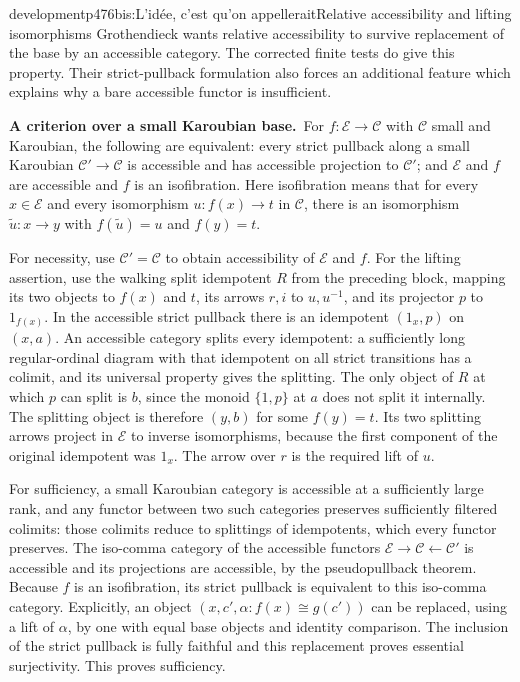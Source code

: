 \begin{dcomment}{development}{p476bis:L'idée, c'est qu'on appellerait}{Relative accessibility and lifting isomorphisms}
Grothendieck wants relative accessibility to survive replacement of the base by an accessible category. The corrected finite tests do give this property. Their strict-pullback formulation also forces an additional feature which explains why a bare accessible functor is insufficient.

\textbf{A criterion over a small Karoubian base.}\ours\
For $f:\mathcal E\to\mathcal C$ with $\mathcal C$ small and Karoubian, the following are equivalent: every strict pullback along a small Karoubian $\mathcal C'\to\mathcal C$ is accessible and has accessible projection to $\mathcal C'$; and $\mathcal E$ and $f$ are accessible and $f$ is an isofibration. Here isofibration means that for every $x\in\mathcal E$ and every isomorphism $u:f(x)\to t$ in $\mathcal C$, there is an isomorphism $\widetilde u:x\to y$ with $f(\widetilde u)=u$ and $f(y)=t$.

For necessity, use $\mathcal C'=\mathcal C$ to obtain accessibility of $\mathcal E$ and $f$. For the lifting assertion, use the walking split idempotent $R$ from the preceding block, mapping its two objects to $f(x)$ and $t$, its arrows $r,i$ to $u,u^{-1}$, and its projector $p$ to $1_{f(x)}$. In the accessible strict pullback there is an idempotent $(1_x,p)$ on $(x,a)$. An accessible category splits every idempotent: a sufficiently long regular-ordinal diagram with that idempotent on all strict transitions has a colimit, and its universal property gives the splitting. The only object of $R$ at which $p$ can split is $b$, since the monoid $\{1,p\}$ at $a$ does not split it internally. The splitting object is therefore $(y,b)$ for some $f(y)=t$. Its two splitting arrows project in $\mathcal E$ to inverse isomorphisms, because the first component of the original idempotent was $1_x$. The arrow over $r$ is the required lift of $u$.

For sufficiency, a small Karoubian category is accessible at a sufficiently large rank, and any functor between two such categories preserves sufficiently filtered colimits: those colimits reduce to splittings of idempotents, which every functor preserves. The iso-comma category of the accessible functors $\mathcal E\to\mathcal C\leftarrow\mathcal C'$ is accessible and its projections are accessible, by the pseudopullback theorem. Because $f$ is an isofibration, its strict pullback is equivalent to this iso-comma category. Explicitly, an object $(x,c',\alpha:f(x)\cong g(c'))$ can be replaced, using a lift of $\alpha$, by one with equal base objects and identity comparison. The inclusion of the strict pullback is fully faithful and this replacement proves essential surjectivity. This proves sufficiency.


\end{dcomment}
